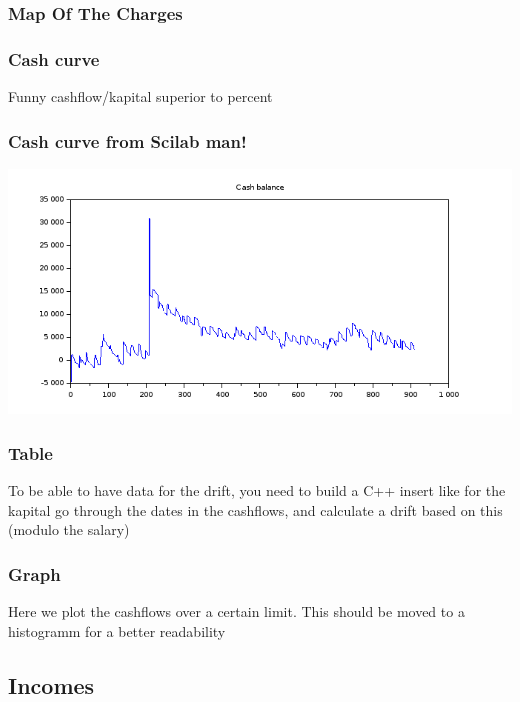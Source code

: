 \documentclass[8pt]{article} %
\begin{document}
\subsubsection{Map Of The Charges}
%


\subsubsection{Cash curve}
Funny cashflow/kapital superior to percent\\


\subsubsection{Cash curve from Scilab man!}
\includegraphics[scale=0.6]{Scilab-cashBalance.png}

\subsubsection{Table}

To be able to have data for the drift, you need to build a C++ insert like for the kapital
go through the dates in the cashflows, and calculate a drift based on this (modulo the salary) 
\subsubsection{Graph}
%
%
Here we plot the cashflows over a certain limit. This should be moved to a histogramm for a better readability

\subsection{Incomes}
%
\end{document}
